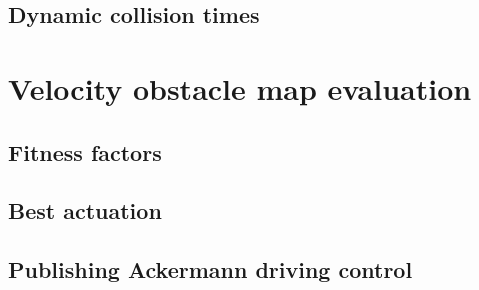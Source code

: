 \subsection{Dynamic collision times}

\section{Velocity obstacle map evaluation}
\label{chap:velocity_obstacle_map_evaluation}

\subsection{Fitness factors}

\subsection{Best actuation}

\subsection{Publishing Ackermann driving control}
